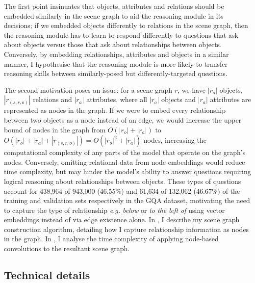 The first point insinuates that objects, attributes and relations should be embedded similarly in the scene graph to aid the reasoning module in its decisions; if we embedded objects differently to relations in the scene graph, then the reasoning module has to learn to respond differently to questions that ask about objects versus those that ask about relationships between objects. Conversely, by embedding relationships, attributes and objects in a similar manner, I hypothesise that the reasoning module is more likely to transfer reasoning skills between similarly-posed but differently-targeted questions.

The second motivation poses an issue: for a scene graph \(r\), we have \(|r_o|\) objects, \(|r_{(s,r,o)}|\) relations and \(|r_a|\) attributes, where all \(|r_o|\) objects and \(|r_a|\) attributes are represented as nodes in the graph. If we were to embed every relationship between two objects as a node instead of an edge, we would increase the upper bound of nodes in the graph from \(O(|r_o| + |r_a|)\) to \(O(|r_o| + |r_a| + |r_{(s,r,o)}|) = O(|r_o|^2 + |r_a|)\) nodes, increasing the computational complexity of any parts of the model that operate on the graph's nodes. Conversely, omitting relational data from node embeddings would reduce time complexity, but may hinder the model's ability to answer questions requiring logical reasoning about relationships between objects. These types of questions account for 438,964 of 943,000 (46.55\%) and 61,634 of 132,062 (46.67\%) of the training and validation sets respectively in the GQA dataset, motivating the need to capture the type of relationship \textit{e.g. below} or \textit{to the left of} using vector embeddings instead of via edge existence alone. In \subsectionautorefname{ \ref{sec:scene_graph_embedding_details}}, I describe my scene graph construction algorithm, detailing how I capture relationship information as nodes in the graph. In \subsectionautorefname{ \ref{sec:scene_graph_complexity_analysis}}, I analyse the time complexity of applying node-based convolutions to the resultant scene graph.

\subsection{Technical details}
\label{sec:scene_graph_embedding_details}

